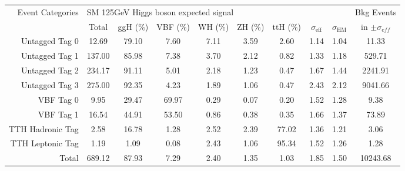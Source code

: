   \begin{tabular}{ |r | c | c | c  | c |  c |  c |  c |  c |  c | }
  \hline
  \hline
  \hline
  \multirow{2}{*}{Event Categories} &\multicolumn{8}{|l|}{SM 125GeV Higgs boson expected signal} & Bkg Events\\ \cline{2-9}
    &  Total & ggH (\%) & VBF (\%) & WH (\%) & ZH (\%) & ttH (\%) &   $\sigma_{\text{eff}} $  & $\sigma_{\text{HM}} $ & in $ \pm \sigma_{eff}$  \\
    \hline
    \hline
    Untagged Tag 0 &    12.69  &  79.10  &  7.60  &  7.11  &  3.59  &  2.60 & 1.14 & 1.04 & 11.33 \\
    Untagged Tag 1 &    137.00  &  85.98  &  7.38  &  3.70  &  2.12  &  0.82 & 1.33 & 1.18 & 529.71 \\
    Untagged Tag 2 &    234.17  &  91.11  &  5.01  &  2.18  &  1.23  &  0.47 & 1.67 & 1.44 & 2241.91 \\
    Untagged Tag 3 &    275.00  &  92.35  &  4.23  &  1.89  &  1.06  &  0.47 & 2.43 & 2.12 & 9041.66 \\
    VBF Tag 0 &    9.95  &  29.47  &  69.97  &  0.29  &  0.07  &  0.20 & 1.52 & 1.28 & 9.38 \\
    VBF Tag 1 &    16.54  &  44.91  &  53.50  &  0.86  &  0.38  &  0.35 & 1.66 & 1.37 & 73.89 \\
    TTH Hadronic Tag &    2.58  &  16.78  &  1.28  &  2.52  &  2.39  &  77.02 & 1.36 & 1.21 & 3.06 \\
    TTH Leptonic Tag &    1.19  &  1.09  &  0.08  &  2.43  &  1.06  &  95.34 & 1.52 & 1.26 & 1.28 \\
    Total &    689.12  &  87.93  &  7.29  &  2.40  &  1.35  &  1.03 & 1.85 & 1.50 & 10243.68 \\
    \hline
    \hline
    \end{tabular}

